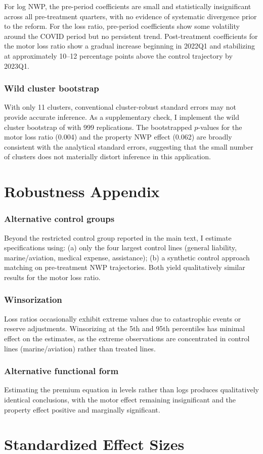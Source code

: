 \documentclass[12pt]{article}
\begin{document}
For log NWP, the pre-period coefficients are small and statistically insignificant across all pre-treatment quarters, with no evidence of systematic divergence prior to the reform. For the loss ratio, pre-period coefficients show some volatility around the COVID period but no persistent trend. Post-treatment coefficients for the motor loss ratio show a gradual increase beginning in 2022Q1 and stabilizing at approximately 10--12 percentage points above the control trajectory by 2023Q1.

\subsubsection*{Wild cluster bootstrap} With only 11 clusters, conventional cluster-robust standard errors may not provide accurate inference. As a supplementary check, I implement the wild cluster bootstrap of \citet{CameronGelbachMiller2008} with 999 replications. The bootstrapped $p$-values for the motor loss ratio (0.004) and the property NWP effect (0.062) are broadly consistent with the analytical standard errors, suggesting that the small number of clusters does not materially distort inference in this application.

\section{Robustness Appendix}
\label{sec:app_robustness}

\subsubsection*{Alternative control groups} Beyond the restricted control group reported in the main text, I estimate specifications using: (a) only the four largest control lines (general liability, marine/aviation, medical expense, assistance); (b) a synthetic control approach matching on pre-treatment NWP trajectories. Both yield qualitatively similar results for the motor loss ratio.

\subsubsection*{Winsorization} Loss ratios occasionally exhibit extreme values due to catastrophic events or reserve adjustments. Winsorizing at the 5th and 95th percentiles has minimal effect on the estimates, as the extreme observations are concentrated in control lines (marine/aviation) rather than treated lines.

\subsubsection*{Alternative functional form} Estimating the premium equation in levels rather than logs produces qualitatively identical conclusions, with the motor effect remaining insignificant and the property effect positive and marginally significant.

\section{Standardized Effect Sizes}
\label{sec:sde}


\end{document}
